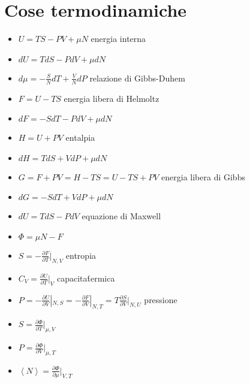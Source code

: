 \documentclass[a4paper]{article}
\begin{document}
    \section{Cose termodinamiche}
        \begin{itemize}
            \item $U=TS-PV+\mu N$ energia interna
            \item $dU=TdS-PdV+\mu dN$
            \item $d\mu=-\frac{S}{N}dT+\frac{V}{N}dP$ relazione di Gibbs-Duhem
            \item $F=U-TS$ energia libera di Helmoltz
            \item $dF=-SdT-PdV+\mu dN$
            \item $H=U+PV$ entalpia
            \item $dH=TdS+VdP+\mu dN$
            \item $G=F+PV=H-TS=U-TS+PV$ energia libera di Gibbs
            \item $dG=-SdT+VdP+\mu dN$
            \item $dU=TdS-PdV$ equazione di Maxwell
            \item $\Phi=\mu N-F$
            \item $S=-\frac{\partial F}{\partial T}|_{N,V}$ entropia
            \item $C_V=\frac{\partial U}{\partial T}|_{V}$ capacita\' termica
            \item $P=-\frac{\partial U}{\partial V}|_{N,S}=-\frac{\partial F}{\partial V}|_{N,T}=T\frac{\partial S}{\partial V}|_{N,U}$ pressione
            \item $S=\frac{\partial\Phi}{\partial T}|_{\mu, V}$
            \item $P=\frac{\partial\Phi}{\partial V}|_{\mu,T}$
            \item $\left\langle N \right\rangle=\frac{\partial\Phi}{\partial\mu}|_{V,T}$
        \end{itemize}
\end{document}

